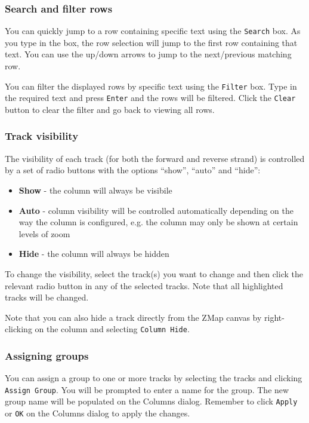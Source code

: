 \documentclass[letterpaper]{article}
\begin{document}
\subsubsection{Search and filter rows}
You can quickly jump to a row containing specific text using the \lstinline{Search} box. As you type in the box, the row selection will jump to the first row containing that text. You can use the up/down arrows to jump to the next/previous matching row.

You can filter the displayed rows by specific text using the \lstinline{Filter} box. Type in the required text and press \lstinline{Enter} and the rows will be filtered. Click the \lstinline{Clear} button to clear the filter and go back to viewing all rows.

\subsubsection{Track visibility}
The visibility of each track (for both the forward and reverse strand) is controlled by a set of radio buttons with the options ``show'', ``auto'' and ``hide'':
\begin{itemize}
\item \textbf{Show} - the column will always be visibile 
\item \textbf{Auto} - column visibility will be controlled automatically depending on the way the column is configured, e.g. the column may only be shown at certain levels of zoom
\item \textbf{Hide} - the column will always be hidden
\end{itemize}

To change the visibility, select the track(s) you want to change and then click the relevant radio button in any of the selected tracks. Note that all highlighted tracks will be changed.

Note that you can also hide a track directly from the ZMap canvas by right-clicking on the column and selecting \lstinline{Column Hide}.

\subsubsection{Assigning groups} \label{sec_groups}
You can assign a group to one or more tracks by selecting the tracks and clicking \lstinline{Assign Group}. You will be prompted to enter a name for the group. The new group name will be populated on the Columns dialog. Remember to click \lstinline{Apply} or \lstinline{OK} on the Columns dialog to apply the changes.
\end{document}
